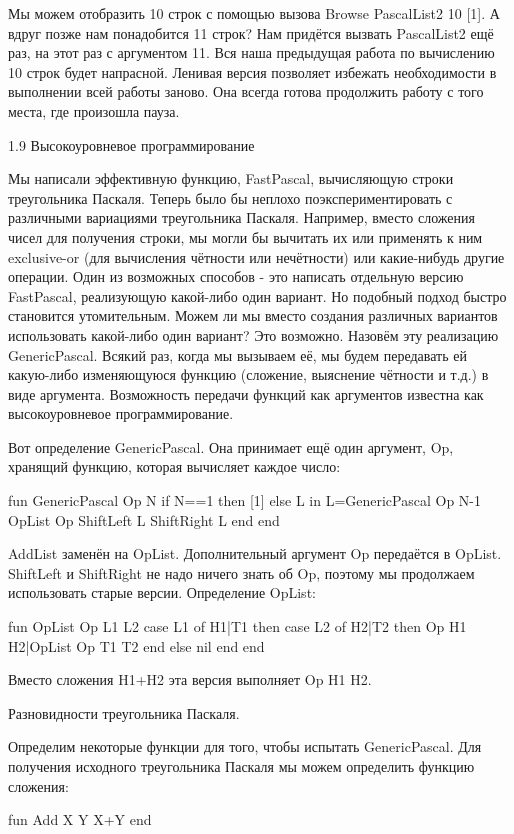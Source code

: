 Мы можем отобразить 10 строк с помощью вызова {Browse {PascalList2 10 [1]}}. А вдруг позже нам понадобится 11 строк? Нам придётся вызвать PascalList2 ещё раз, на этот раз с аргументом 11. Вся наша предыдущая работа по вычислению 10 строк будет напрасной. Ленивая версия позволяет избежать необходимости в выполнении всей работы заново. Она всегда готова продолжить работу с того места, где произошла пауза.

1.9 Высокоуровневое программирование

Мы написали эффективную функцию, FastPascal, вычисляющую строки треугольника Паскаля. Теперь было бы неплохо поэкспериментировать с различными вариациями треугольника Паскаля. Например, вместо сложения чисел для получения строки, мы могли бы вычитать их или применять к ним exclusive-or (для вычисления чётности или нечётности) или какие-нибудь другие операции. Один из возможных способов - это написать отдельную версию FastPascal, реализующую какой-либо один вариант. Но подобный подход быстро становится утомительным. Можем ли мы вместо создания различных вариантов использовать какой-либо один вариант? Это возможно. Назовём эту реализацию GenericPascal. Всякий раз, когда мы вызываем её, мы будем передавать ей какую-либо изменяющуюся функцию (сложение, выяснение чётности и т.д.) в виде аргумента. Возможность передачи функций как аргументов известна как высокоуровневое программирование.

Вот определение GenericPascal. Она принимает ещё один аргумент, Op, хранящий функцию, которая вычисляет каждое число:

fun {GenericPascal Op N}
if N==1 then [1]
else L in
L={GenericPascal Op N-1}
{OpList Op {ShiftLeft L} {ShiftRight L}}
end
end

AddList заменён на OpList. Дополнительный аргумент Op передаётся в OpList. ShiftLeft и ShiftRight не надо ничего знать об Op, поэтому мы продолжаем использовать старые версии. Определение OpList:

fun {OpList Op L1 L2}
case L1 of H1|T1 then
case L2 of H2|T2 then
{Op H1 H2}|{OpList Op T1 T2}
end
else nil end
end

Вместо сложения H1+H2 эта версия выполняет {Op H1 H2}.

Разновидности треугольника Паскаля.

Определим некоторые функции для того, чтобы испытать GenericPascal. Для получения исходного треугольника Паскаля мы можем определить функцию сложения:

fun {Add X Y} X+Y end


